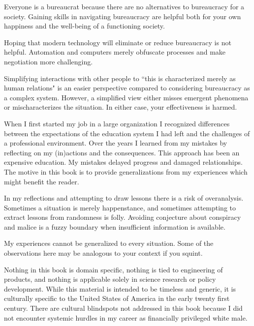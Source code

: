 Everyone is a bureaucrat because there are no alternatives to bureaucracy for a society. Gaining skills in navigating bureaucracy are helpful both for your own happiness and the well-being of a functioning society. 

Hoping that modern technology will eliminate or reduce bureaucracy is not helpful. Automation and computers merely obfuscate processes and make negotiation more challenging. 

Simplifying interactions with other people to ``this is characterized merely as human relations" is an easier perspective compared to considering bureaucracy as a complex system. 
However, a simplified view either misses emergent phenomena or mischaracterizes the situation. In either case, your effectiveness is harmed.



 When I first started my job in a large organization I recognized differences between the expectations of the education system I had left and the challenges of a professional environment. Over the years I learned from my mistakes by reflecting on my (in)actions and the consequences. This approach has been an expensive education. My mistakes delayed progress and damaged relationships. The motive in this book is to provide generalizations from my experiences which might benefit the reader.



In my reflections and attempting to draw lessons there is a risk of overanalysis. Sometimes a situation is merely happenstance, and sometimes attempting to extract lessons from randomness is folly. Avoiding conjecture about conspiracy and malice is a fuzzy boundary when insufficient information is available. 

My experiences cannot be generalized to every situation. Some of the observations here may be analogous to your context if you squint. 

Nothing in this book is domain specific, nothing is tied to engineering of products, and nothing is applicable solely in science research or policy development. While this material is intended to be timeless and generic, it is culturally specific to the United States of America in the early twenty first century. There are cultural blindspots not addressed in this book because I did not encounter systemic hurdles in my career as financially privileged white male. 

